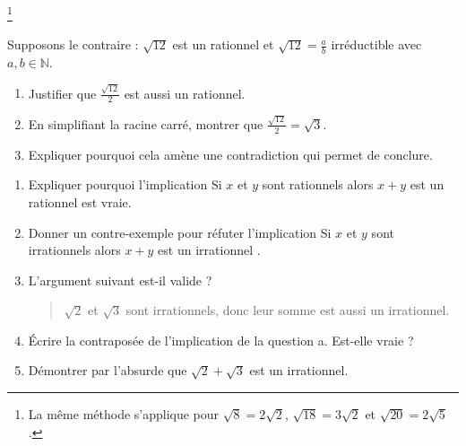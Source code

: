 \vfill 
\begin{exercise}\footnote{La même méthode s'applique pour $\sqrt{8}=2\sqrt{2}$, $\sqrt{18}=3\sqrt{2}$ et $\sqrt{20}=2\sqrt{5}$.} \hfill 
	
Supposons le contraire : $\sqrt{12}$ est un rationnel et $\sqrt{12}=\frac{a}{b}$ irréductible avec $a, b\in\mathbb{N}$.
	\begin{enumerate}[label={\alph*)},leftmargin=*]
		\item Justifier que $\tfrac{\sqrt{12}}{2}$ est aussi un rationnel.
		\item En simplifiant la racine carré, montrer que $\tfrac{\sqrt{12}}{2}=\sqrt{3}$.
		\item Expliquer pourquoi cela amène une contradiction qui permet de conclure.
	\end{enumerate} 
\end{exercise} 

%	
\newpage

\begin{exercise}\hfill 
\begin{enumerate}[label={\alph*)},leftmargin=*]
	\item Expliquer pourquoi l'implication \og Si $x$ et $y$ sont rationnels alors $x+y$ est un rationnel \fg{} est vraie.
	\item Donner un contre-exemple pour réfuter l'implication  \og Si $x$ et $y$ sont irrationnels alors $x+y$ est un irrationnel \fg{}.
	\item L'argument suivant est-il valide ? 
	\begin{quote}
		$\sqrt{2}$ et $\sqrt{3}$ sont irrationnels, donc leur somme est aussi un irrationnel.
	\end{quote}
	\item Écrire la contraposée de l'implication de la question a. Est-elle vraie ?
	\item Démontrer par l'absurde que $\sqrt{2}+\sqrt{3}$ est un irrationnel.
\end{enumerate}
\end{exercise}



